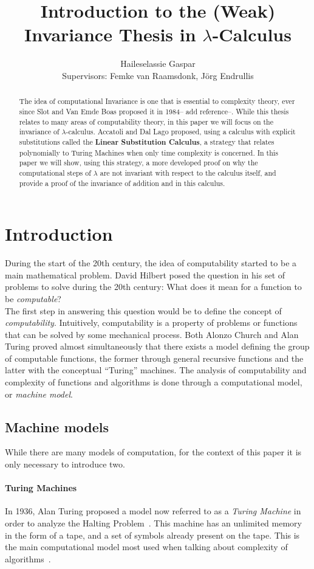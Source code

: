 \documentclass[12pt]{article}
\title{Introduction to the (Weak) Invariance Thesis in $\lambda$-Calculus}
\author{Haileselassie Gaspar\\[1cm]{\small Supervisors: Femke van Raamsdonk, Jörg Endrullis}}
\begin{document}
\maketitle
\begin{abstract}
  The idea of computational Invariance is one that is essential to complexity theory, ever since Slot and Van Emde Boas proposed it in 1984-- add reference--. While this thesis relates to many areas of computability theory, in this paper we will focus on the invariance of $\lambda$-calculus. Accatoli and Dal Lago proposed, using a calculus with explicit substitutions called the \textbf{Linear Substitution Calculus}, a strategy that relates polynomially to Turing Machines when only time complexity is concerned. In this paper we will show, using this strategy, a more developed proof on why the computational steps of $\lambda$ are not invariant with respect to the calculus itself, and provide a proof of the invariance of addition and in this calculus.
\end{abstract}
\section{Introduction}
During the start of the 20th century, the idea of computability started to be a main mathematical problem. David Hilbert posed the question in his set of problems to solve during the 20th century: What does it mean for a function to be \textit{computable}? \\
The first step in answering this question would be to define the concept of \textit{computability}. Intuitively, computability is a property of problems or functions that can be solved by some mechanical process. Both Alonzo Church and Alan Turing proved almost simultaneously that there exists a model defining the group of computable functions, the former through general recursive functions and the latter with the conceptual \enquote{Turing} machines.
The analysis of computability and complexity of functions and algorithms is done through a computational model, or \textit{machine model}.
\subsection{Machine models}
While there are many models of computation, for the context of this paper it is only necessary to introduce two.

\paragraph{Turing Machines}
In 1936, Alan Turing proposed a model now referred to as a \textit{Turing Machine} in order to analyze the Halting Problem~\cite{on-computable-numbers}. This machine has an unlimited memory in the form of a tape, and a set of symbols already present on the tape. This is the main computational model most used when talking about complexity of algorithms~\cite{computation-theory}.
\end{document}
